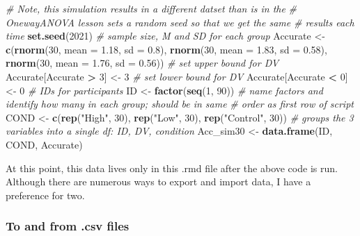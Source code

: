 \documentclass[
  11pt,
]{book}
\newenvironment{Shaded}{\begin{snugshade}}{\end{snugshade}}
\newcommand{\AttributeTok}[1]{\textcolor[rgb]{0.27,0.27,0.27}{#1}}
\newcommand{\CommentTok}[1]{\textcolor[rgb]{0.37,0.37,0.37}{\textit{#1}}}
\newcommand{\DecValTok}[1]{\textcolor[rgb]{0.06,0.06,0.06}{#1}}
\newcommand{\FloatTok}[1]{\textcolor[rgb]{0.06,0.06,0.06}{#1}}
\newcommand{\FunctionTok}[1]{\textcolor[rgb]{0.27,0.27,0.27}{\textbf{#1}}}
\newcommand{\NormalTok}[1]{#1}
\newcommand{\OtherTok}[1]{\textcolor[rgb]{0.37,0.37,0.37}{#1}}
\newcommand{\SpecialCharTok}[1]{\textcolor[rgb]{0.43,0.43,0.43}{\textbf{#1}}}
\newcommand{\StringTok}[1]{\textcolor[rgb]{0.5,0.5,0.5}{#1}}
\begin{document}
\begin{Shaded}
\begin{Highlighting}[]
\CommentTok{\# Note, this simulation results in a different datset than is in the}
\CommentTok{\# OnewayANOVA lesson sets a random seed so that we get the same}
\CommentTok{\# results each time}
\FunctionTok{set.seed}\NormalTok{(}\DecValTok{2021}\NormalTok{)}
\CommentTok{\# sample size, M and SD for each group}
\NormalTok{Accurate }\OtherTok{\textless{}{-}} \FunctionTok{c}\NormalTok{(}\FunctionTok{rnorm}\NormalTok{(}\DecValTok{30}\NormalTok{, }\AttributeTok{mean =} \FloatTok{1.18}\NormalTok{, }\AttributeTok{sd =} \FloatTok{0.8}\NormalTok{), }\FunctionTok{rnorm}\NormalTok{(}\DecValTok{30}\NormalTok{, }\AttributeTok{mean =} \FloatTok{1.83}\NormalTok{,}
    \AttributeTok{sd =} \FloatTok{0.58}\NormalTok{), }\FunctionTok{rnorm}\NormalTok{(}\DecValTok{30}\NormalTok{, }\AttributeTok{mean =} \FloatTok{1.76}\NormalTok{, }\AttributeTok{sd =} \FloatTok{0.56}\NormalTok{))}
\CommentTok{\# set upper bound for DV}
\NormalTok{Accurate[Accurate }\SpecialCharTok{\textgreater{}} \DecValTok{3}\NormalTok{] }\OtherTok{\textless{}{-}} \DecValTok{3}
\CommentTok{\# set lower bound for DV}
\NormalTok{Accurate[Accurate }\SpecialCharTok{\textless{}} \DecValTok{0}\NormalTok{] }\OtherTok{\textless{}{-}} \DecValTok{0}
\CommentTok{\# IDs for participants}
\NormalTok{ID }\OtherTok{\textless{}{-}} \FunctionTok{factor}\NormalTok{(}\FunctionTok{seq}\NormalTok{(}\DecValTok{1}\NormalTok{, }\DecValTok{90}\NormalTok{))}
\CommentTok{\# name factors and identify how many in each group; should be in same}
\CommentTok{\# order as first row of script}
\NormalTok{COND }\OtherTok{\textless{}{-}} \FunctionTok{c}\NormalTok{(}\FunctionTok{rep}\NormalTok{(}\StringTok{"High"}\NormalTok{, }\DecValTok{30}\NormalTok{), }\FunctionTok{rep}\NormalTok{(}\StringTok{"Low"}\NormalTok{, }\DecValTok{30}\NormalTok{), }\FunctionTok{rep}\NormalTok{(}\StringTok{"Control"}\NormalTok{, }\DecValTok{30}\NormalTok{))}
\CommentTok{\# groups the 3 variables into a single df: ID, DV, condition}
\NormalTok{Acc\_sim30 }\OtherTok{\textless{}{-}} \FunctionTok{data.frame}\NormalTok{(ID, COND, Accurate)}
\end{Highlighting}
\end{Shaded}

At this point, this data lives only in this .rmd file after the above code is run. Although there are numerous ways to export and import data, I have a preference for two.

\hypertarget{to-and-from-.csv-files}{%
\subsubsection{To and from .csv files}\label{to-and-from-.csv-files}}
\end{document}
